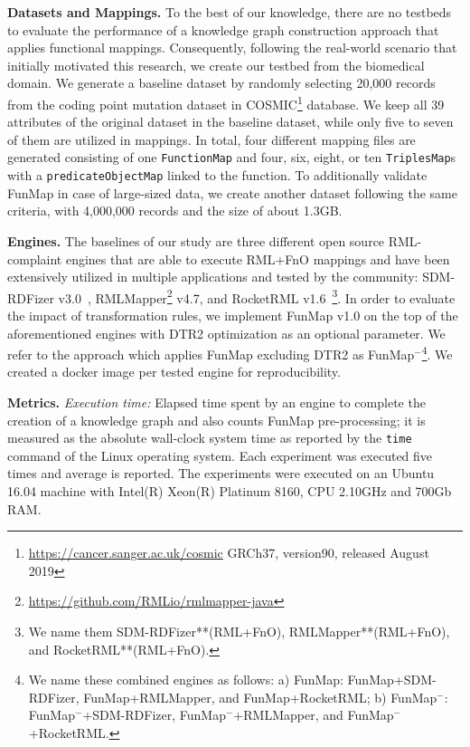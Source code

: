 \noindent\textbf{Datasets and Mappings.}
To the best of our knowledge, there are no testbeds to evaluate the performance of a knowledge graph construction approach that applies functional mappings. Consequently, following the real-world scenario that initially motivated this research, we create our testbed from the biomedical domain. We generate a baseline dataset by randomly selecting 20,000 records from the coding point mutation dataset in COSMIC\footnote{\url{https://cancer.sanger.ac.uk/cosmic} GRCh37, version90, released August 2019} database. We keep all 39 attributes of the original dataset in the baseline dataset, while only five to seven of them are utilized in mappings. In total, four different mapping files are generated consisting of one \verb|FunctionMap| and four, six, eight, or ten \verb|TriplesMap|s with a \verb|predicateObjectMap| linked to the function. To additionally validate FunMap in case of large-sized data, we create another dataset following the same criteria, with 4,000,000 records and the size of about 1.3GB.

\noindent\textbf{Engines.}
The baselines of our study are three different open source RML-complaint engines that are able to execute RML+FnO mappings and have been extensively utilized in multiple applications and tested by the community: SDM-RDFizer v3.0~\citep{iglesias2020sdm}, RMLMapper\footnote{\url{https://github.com/RMLio/rmlmapper-java}} v4.7, and RocketRML v1.6~\citep{csimcsek2019rocketrml}\footnote{We name them SDM-RDFizer**(RML+FnO), RMLMapper**(RML+FnO), and RocketRML**(RML+FnO).}. In order to evaluate the impact of transformation rules, we implement FunMap v1.0 on the top of the aforementioned engines with DTR2 optimization as an optional parameter. We refer to the approach which applies FunMap excluding DTR2 as FunMap$^-$\footnote{We name these combined engines as follows: a) FunMap: FunMap+SDM-RDFizer, FunMap+RMLMapper, and FunMap+RocketRML; b) FunMap$^-$: FunMap$^-$+SDM-RDFizer, FunMap$^-$+RMLMapper, and FunMap$^-$+RocketRML.}. We created a docker image per tested engine for reproducibility.  

\noindent\textbf{Metrics.} \textit{Execution time:} Elapsed time spent by an engine to complete the creation of a knowledge graph and also counts FunMap pre-processing; it is measured as the absolute wall-clock system time as reported by the \verb|time| command of the Linux operating system. Each experiment was executed five times and average is reported. The experiments were executed on an Ubuntu 16.04 machine with Intel(R) Xeon(R) Platinum 8160, CPU 2.10GHz and 700Gb RAM. 

